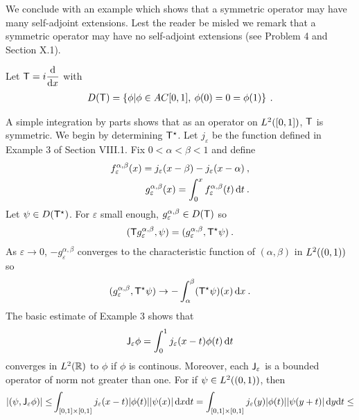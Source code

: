 We conclude with an example which shows that a symmetric operator may have many self-adjoint extensions. Lest the reader be misled we remark that a symmetric operator may have no self-adjoint extensions (see Problem 4 and Section X.1).

\begin{example}
    Let $\mathsf{T} = i \dfrac{\mathrm{d}}{\mathrm{d}x}$ with \begin{align}
        D(\mathsf{T}) = \left \lbrace \phi | \phi \in AC[0,1], \: \phi(0)=0= \phi(1) \right \rbrace \:.
    \end{align}

A simple integration by parts shows that as an operator on $L^{2}([0,1])$, $\mathsf{T}$ is
symmetric. We begin by determining $\mathsf{T}^\star$. Let $j_\varepsilon$ be the function defined in Example 3 of Section VIII.1. Fix $0 <\alpha < \beta <1 $ and define  \begin{align}
    f_\varepsilon^{\alpha, \beta} (x) = j_\varepsilon(x-\beta) - j_\varepsilon(x - \alpha) \:, \\
    g_\varepsilon^{\alpha, \beta} (x) = \int_0^x f_\varepsilon^{\alpha, \beta} (t) \, \mathrm{d} t \:.
\end{align}
Let $\psi \in D(\mathsf{T}^\star)$. For $\varepsilon$ small enough, $g_\varepsilon^{\alpha, \beta} \in D(\mathsf{T})$ so \begin{align}
    (\mathsf{T} g_\varepsilon^{\alpha, \beta} , \psi) =(g_\varepsilon^{\alpha, \beta}, \mathsf{T}^\star \psi) \:.
\end{align}
As $\varepsilon \rightarrow 0$, $-g_\varepsilon^{\alpha, \beta}$ converges to the characteristic function of $(\alpha, \beta)$ in $L^{2}((0,1))$ so 
\begin{align}
    (g_\varepsilon^{\alpha, \beta}, \mathsf{T}^\star \psi) \rightarrow - \int_\alpha^\beta (\mathsf{T}^\star \psi)(x) \, \mathrm{d} x \:.
\end{align}
The basic estimate of Example 3 shows that \begin{align}
    \mathsf{J}_\varepsilon \phi = \int_0^1 j_\varepsilon(x-t)\phi(t)\, \mathrm{d} t
\end{align}
converges in $L^{2}(\mathbb{R})$ to $\phi$ if $\phi$ is continous. Moreover, each $\mathsf{J}_\varepsilon$ is a bounded operator of norm not greater than one. For if $\psi \in L^{2}((0,1))$, then \begin{align}
    |(\psi, \op J_\varepsilon \phi)| 
    \leq&
     \int_{[0,1]\times [0,1]} j_\varepsilon(x-t) |\phi(t)| |\psi(x)| \, \D x \D t 
    =
     \int_{[0,1]\times [0,1]} j_\varepsilon(y) |\phi(t)| |\psi(y+t)| \, \D y \D t 
     \leq \\ 

\end{align}
\end{example}
